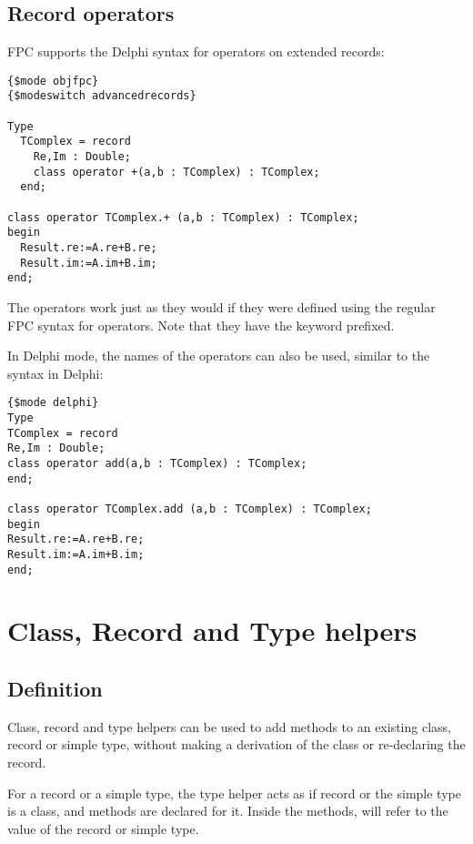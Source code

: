 \section{Record operators}
FPC supports the Delphi syntax for operators on extended records:
\begin{verbatim}
{$mode objfpc}
{$modeswitch advancedrecords}

Type
  TComplex = record
    Re,Im : Double;
    class operator +(a,b : TComplex) : TComplex;
  end;

class operator TComplex.+ (a,b : TComplex) : TComplex;
begin
  Result.re:=A.re+B.re;
  Result.im:=A.im+B.im;
end; 
\end{verbatim}
The operators work just as they would if they were defined using the regular FPC syntax for operators.
Note that they have the  keyword prefixed. 

In Delphi mode, the names of the operators can also be used, similar to the syntax in Delphi:
\begin{verbatim}
{$mode delphi}
Type
TComplex = record
Re,Im : Double;
class operator add(a,b : TComplex) : TComplex;
end;

class operator TComplex.add (a,b : TComplex) : TComplex;
begin
Result.re:=A.re+B.re;
Result.im:=A.im+B.im;
end; 
\end{verbatim}

\chapter{Class, Record and Type helpers}
\label{ch:ClassHelpers}
%

\section{Definition}
Class, record and type helpers can be used to add methods to an existing class,
record or simple type, without making a derivation of the class or re-declaring the record.

For a record or a simple type, the type helper acts as if record or the simple type 
is a class, and methods are declared for it. Inside the methods,  will refer 
to the value of the record or simple type.

